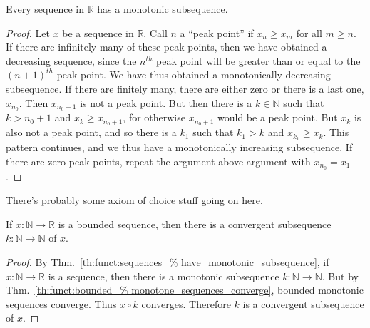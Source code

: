 \documentclass[crop=false,class=book,oneside]{standalone}
\begin{document}
            \begin{theorem}
                \label{th:funct:sequences_have_%
                       monotonic_subsequence}
                Every sequence in $\mathbb{R}$
                has a monotonic subsequence.
            \end{theorem}
            \begin{proof}
                Let $x$ be a sequence in $\mathbb{R}$.
                Call $n$ a ``peak point'' if
                $x_{n}\geq{x_{m}}$ for all
                ${m}\geq{n}$. If there are infinitely many
                of these peak points, then we have obtained
                a decreasing sequence, since the $n^{th}$
                peak point will be greater than or equal to
                the $(n+1)^{th}$ peak point.
                We have thus obtained
                a monotonically decreasing subsequence.
                If there are finitely many,
                there are either zero or there is a last one,
                $x_{n_{0}}$. Then $x_{n_{0}+1}$ is not a
                peak point. But then there is a
                $k\in\mathbb{N}$ such that $k>n_{0}+1$ and
                $x_{k}\geq{x_{n_{0}+1}}$, for otherwise
                $x_{n_{0}+1}$ would be a peak point. But
                $x_{k}$ is also not a peak point, and so
                there is a $k_{1}$ such that $k_{1}>k$ and
                $x_{k_{1}}\geq{x_{k}}$. This pattern
                continues, and we thus have a monotonically
                increasing subsequence. If there are zero
                peak points, repeat the argument above
                argument with $x_{n_{0}}=x_{1}$.
            \end{proof}
            There's probably some axiom of choice stuff
            going on here.
            \begin{theorem}
                If $x:\mathbb{N}\rightarrow\mathbb{R}$
                is a bounded sequence, then there is
                a convergent subsequence
                $k:\mathbb{N}\rightarrow\mathbb{N}$
                of $x$.
            \end{theorem}
            \begin{proof}
                By Thm.~\ref{th:funct:sequences_%
                             have_monotonic_subsequence},
                if $x:\mathbb{N}\rightarrow\mathbb{R}$ is a
                sequence, then there is a monotonic subsequence
                $k:\mathbb{N}\rightarrow\mathbb{N}$.
                But by Thm.~\ref{th:funct:bounded_%
                                 monotone_sequences_converge},
                bounded monotonic sequences converge.
                Thus $x\circ{k}$ converges.
                Therefore $k$ is a convergent
                subsequence of $x$.
            \end{proof}
\end{document}
